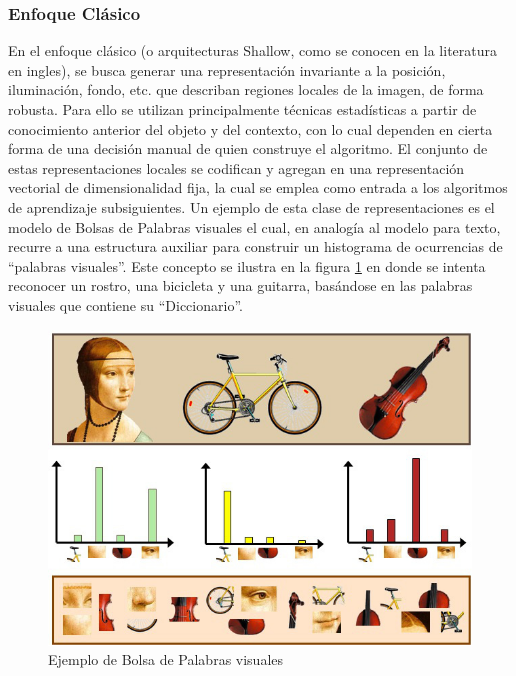 \documentclass[a4paper,11pt,spanish]{book}
\begin{document}
      \subsubsection{Enfoque Clásico}
	En el enfoque clásico (o arquitecturas Shallow, como se conocen en la literatura en ingles), se busca generar una representación invariante a la posición, iluminación, 
	fondo, etc. que describan regiones locales de la imagen, de forma robusta. 
	Para ello se utilizan principalmente técnicas estadísticas a partir de conocimiento anterior del objeto y del contexto,
	con lo cual dependen en cierta forma de una decisión manual de quien construye el algoritmo.
	El conjunto de estas representaciones locales se codifican y agregan en una representación vectorial de dimensionalidad fija, la cual se emplea como
        entrada a los algoritmos de aprendizaje subsiguientes. 
        Un ejemplo de esta clase de representaciones es el modelo de Bolsas de Palabras visuales el cual, en analogía al modelo para texto, 
        recurre a una estructura auxiliar para construir un histograma de ocurrencias de ``palabras visuales''. 
        Este concepto se ilustra en la figura \ref{fig:bovw} en donde se intenta reconocer un rostro, una bicicleta y una guitarra, basándose en las 
        palabras visuales que contiene su ``Diccionario''.

	\begin{figure}[h]
	  \begin{center}
	    \includegraphics[scale=0.5]{./img/bag_of_visual_words.jpg}
	    \caption{Ejemplo de Bolsa de Palabras visuales}
	    \label{fig:bovw}
	  \end{center}
	\end{figure}
\end{document}
